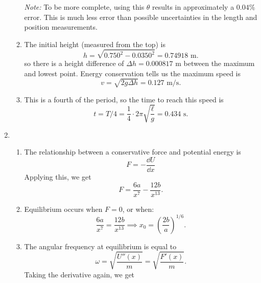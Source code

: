 \documentclass{article}
\begin{document}
\begin{enumerate}
\begin{enumerate}
        \textit{Note:} To be more complete, using this $\theta$ results in approximately a $0.04\%$ error. This is much less error than possible uncertainties in the length and position measurements.
        \item The initial height (measured from the top) is 
        \begin{equation}
            h = \sqrt{0.750^2-0.0350^2} = 0.74918 \text{ m}.
        \end{equation}
        so there is a height difference of $\Delta h = 0.000817 \text{ m}$ between the maximum and lowest point. Energy conservation tells us the maximum speed is 
        \begin{equation}
            \boxed{v=\sqrt{2g\Delta h}=0.127\text{ m/s}}.
        \end{equation}
        \item This is a fourth of the period, so the time to reach this speed is 
        \begin{equation}
            \boxed{t=T/4 = \frac{1}{4} \cdot 2\pi\sqrt{\frac{\ell}{g}} = 0.434 \text{ s}.} 
        \end{equation}
    \end{enumerate}
    \item \begin{enumerate}
        \item The relationship between a conservative force and potential energy is 
        \begin{equation}
            F = -\frac{\dd{U}}{\dd{x}}
        \end{equation}
        Applying this, we get 
        \begin{equation}
            \boxed{F = \frac{6a}{x^7} - \frac{12b}{x^{13}}}.
        \end{equation}
        \item Equilibrium occurs when $F=0$, or when: 
        \begin{equation}
            \frac{6a}{x^7} = \frac{12b}{x^{13}} \implies \boxed{x_0 = \left(\frac{2b}{a}\right)^{1/6}}.
        \end{equation}
        \item The angular frequency at equilibrium is equal to 
        \begin{equation}
            \omega = \sqrt{\frac{U''(x)}{m}} = \sqrt{\frac{F'(x)}{m}}.
        \end{equation}
        Taking the derivative again, we get
        \begin{equation}

\end{equation}
\end{enumerate}
\end{enumerate}
\end{document}
